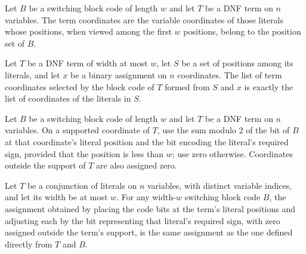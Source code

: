 \begin{definition}
\label{FABL.SwitchingBlockCode.termCoordinates}
\leanok
{}
Let $B$ be a switching block code of length $w$ and let $T$ be a DNF term on $n$
variables. The term coordinates are the variable coordinates of those literals whose
positions, when viewed among the first $w$ positions, belong to the position set of $B$.
\end{definition}

\begin{theorem}
\label{FABL.DNFTerm.termCoordinates_blockCode}
\leanok
{}
Let $T$ be a DNF term of width at most $w$, let $S$ be a set of positions among its
literals, and let $x$ be a binary assignment on $n$ coordinates. The list of term
coordinates selected by the block code of $T$ formed from $S$ and $x$ is exactly the
list of coordinates of the literals in $S$.
\end{theorem}

\begin{definition}
\label{FABL.SwitchingBlockCode.assignmentForTerm}
\leanok
{}
Let $B$ be a switching block code of length $w$ and let $T$ be a DNF term on $n$
variables. On a supported coordinate of $T$, use the sum modulo $2$ of the bit of $B$ at
that coordinate’s literal position and the bit encoding the literal’s required sign,
provided that the position is less than $w$; use zero otherwise. Coordinates outside the
support of $T$ are also assigned zero.
\end{definition}

\begin{theorem}
\label{FABL.SwitchingBlockCode.assignmentForTerm_eq_assignmentOfBlock}
\leanok
{}
Let $T$ be a conjunction of literals on $n$ variables, with distinct variable indices,
and let its width be at most $w$. For any width-$w$ switching block code $B$, the
assignment obtained by placing the code bits at the term’s literal positions and
adjusting each by the bit representing that literal’s required sign, with zero assigned
outside the term’s support, is the same assignment as the one defined directly from $T$
and $B$.
\end{theorem}

